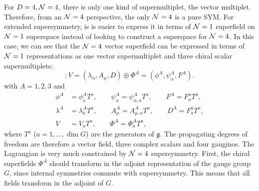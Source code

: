             For $D=4,\mathcal{N}=4$, there is only one kind of supermultiplet, the vector multiplet. Therefore, from an $\mathcal{N}=4$ perspective, the only $\mathcal{N}=4$ is a pure SYM. For extended supersymmetry, is is easier to express it in terms of $\mathcal{N}=1$ superfield on $\mathcal{N}=1$ superspace instead of looking to construct a superspace for $\mathcal{N}=4$. In this case, we can see that the $\mathcal{N} = 4$ vector superfield can be expressed in terms of $\mathcal{N} = 1$ representations as one vector supermultiplet and three chiral scalar supermultiplets:
            \begin{equation}
                [\mN = 4 \text{ vector multiplet}] : V = (\lambda_\alpha, A_\mu, D) \oplus \Phi^A = (\phi^A,\psi^A_\alpha,F^A).
            \end{equation}
            with $A=1,2,3$ and
            \begin{align}
                \phi^A&=\phi^A_a T^a,\qquad \psi^A_\alpha=\psi^A_{\alpha,a}T^a,\qquad F^A=F^a_a T^a,\\
                \lambda^A&=\lambda^A_a T^a,\qquad A^A_\mu=A^A_{\mu,a}T^a,\qquad D^A=F^a_a T^a,\\
                V&=V_aT^a,\qquad \Phi^A=\Phi^A_aT^a,
            \end{align}
            where $T^a$ ($a=1,\dots,\dim G$) are the generators of $\mathfrak{g}$. The propagating degrees of freedom are therefore a vector field, three complex scalars and four gauginos. The Lagrangian is very much constrained by $\mathcal{N} = 4$ supersymmetry. First, the chiral superfields $\Phi^A$ should transform in the adjoint representation of the gauge group $G$, since internal symmetries commute with supersymmetry. This means that all fields transform in the adjoint of $G$.
            
